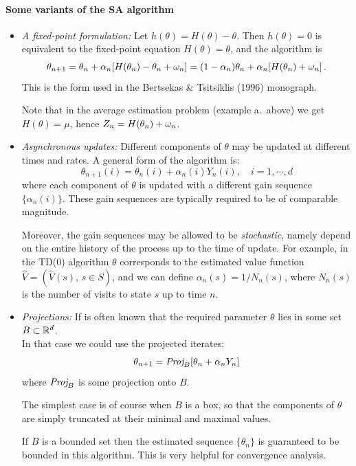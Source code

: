 \paragraph{Some variants of the SA algorithm}
\begin{itemize}
\item
{\em A fixed-point formulation:}
Let $h(\theta) = H(\theta) - \theta$. Then
$h(\theta) = 0$ is equivalent to the fixed-point equation
$H(\theta) = \theta$,  and the algorithm is
$$
\theta_{n+1} = \theta_n + \alpha_n [H(\theta_n) - \theta_n + \omega_n] =
(1-\alpha_n) \theta_n + \alpha_n [H(\theta_n) + \omega_n]\,.
$$
This is the form used in the Bertsekas \& Tsitsiklis (1996) monograph.

Note that in the average estimation problem (example a.~above) we get
$H(\theta)=\mu$, hence $Z_n=H(\theta_n) + \omega_n$.

\item
{\em Asynchronous updates:}
Different components of $\theta$ may be updated at different times and rates.
A general form of the algorithm is:
$$
\theta_{n+1} (i) = \theta_n(i) + \alpha_n(i) Y_n(i), \quad i=1, \cdots, d
$$
where each component of $\theta$ is updated with a different gain sequence
$\{\alpha_n(i)\}$. These gain sequences are typically required to be
of comparable magnitude.

Moreover, the gain sequences may be allowed to be {\em stochastic},
namely depend on the entire history of the process up to the time of update.
For example, in the TD(0) algorithm $\theta$ corresponds to the estimated
value function
$\hat V=(\hat V(s),\,s\in S)$, and we can define $\alpha_n(s)=1/N_n(s)$,
where $N_n(s)$ is the number of visits to state $s$ up to time $n$.

\item
{\em Projections:}
If is often known that the required parameter $\theta$ lies in some set
$B\subset \mathbb{R}^d$.\\
In that case we could use the projected iterates:
$$
\theta_{n+1} = \text{\it Proj}_B [\theta_n + \alpha_n Y_n]
$$
where $\text{\it Proj}_B$ is some projection onto $B$.

The simplest case is of course when $B$ is a box, so that the components
of $\theta$ are simply truncated at their minimal and maximal values.

If $B$ is a bounded set then the estimated sequence $\{\theta_n\}$ is guaranteed
to be bounded in this algorithm. This is very helpful for convergence analysis.

\end{itemize}


